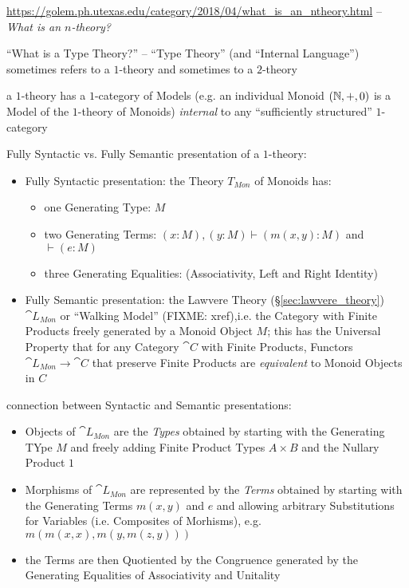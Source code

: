 \asterism

\url{https://golem.ph.utexas.edu/category/2018/04/what_is_an_ntheory.html}
-- \emph{What is an $n$-theory?}

``What is a Type Theory?'' -- ``Type Theory'' (and ``Internal Language'')
sometimes refers to a $1$-theory and sometimes to a $2$-theory

a $1$-theory has a $1$-category of Models (e.g. an individual Monoid $(\mathbb{N}, +
, 0)$ is a Model of the $1$-theory of Monoids) \emph{internal} to any
``sufficiently structured'' $1$-category

Fully Syntactic vs. Fully Semantic presentation of a $1$-theory:

\begin{itemize}
  \item Fully Syntactic presentation: the Theory $T_{Mon}$ of Monoids has:
    \begin{itemize}
      \item one Generating Type: $M$
      \item two Generating Terms: $(x:M),(y:M) \vdash (m(x,y):M)$ and $\vdash
        (e:M)$
      \item three Generating Equalities: (Associativity, Left and Right
        Identity)
    \end{itemize}
  \item Fully Semantic presentation: the Lawvere Theory
    (\S\ref{sec:lawvere_theory}) $\cat{L}_{Mon}$ or ``Walking Model'' (FIXME:
    xref),i.e. the Category with Finite Products freely generated by a Monoid
    Object $M$; this has the Universal Property that for any Category $\cat{C}$
    with Finite Products, Functors $\cat{L}_{Mon} \rightarrow \cat{C}$ that
    preserve Finite Products are \emph{equivalent} to Monoid Objects in $C$
\end{itemize}

connection between Syntactic and Semantic presentations:

\begin{itemize}
  \item Objects of $\cat{L}_{Mon}$ are the \emph{Types} obtained by starting
    with the Generating TYpe $M$ and freely adding Finite Product Types $A
    \times B$ and the Nullary Product $1$
  \item Morphisms of $\cat{L}_{Mon}$ are represented by the \emph{Terms}
    obtained by starting with the Generating Terms $m(x,y)$ and $e$ and
    allowing arbitrary Substitutions for Variables (i.e. Composites of
    Morhisms), e.g. $m(m(x,x), m(y,m(z,y)))$
  \item the Terms are then Quotiented by the Congruence generated by the
    Generating Equalities of Associativity and Unitality
\end{itemize}

